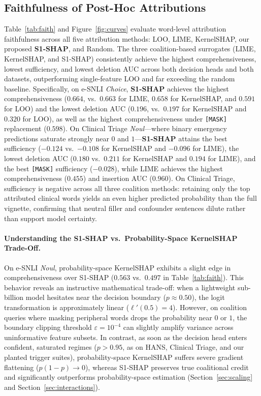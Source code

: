 \documentclass[10pt]{article}
\begin{document}
\subsection{Faithfulness of Post-Hoc Attributions}
Table~\ref{tab:faith} and Figure~\ref{fig:curves} evaluate word-level attribution faithfulness across all five attribution methods: LOO, LIME, KernelSHAP, our proposed \textbf{S1-SHAP}, and Random.
The three coalition-based surrogates (LIME, KernelSHAP, and S1-SHAP) consistently achieve the highest comprehensiveness, lowest sufficiency, and lowest deletion AUC across both decision heads and both datasets, outperforming single-feature LOO and far exceeding the random baseline.
Specifically, on e-SNLI \emph{Choice}, \textbf{S1-SHAP} achieves the highest comprehensiveness ($0.664$, vs.\ $0.663$ for LIME, $0.658$ for KernelSHAP, and $0.591$ for LOO) and the lowest deletion AUC ($0.196$, vs.\ $0.197$ for KernelSHAP and $0.320$ for LOO), as well as the highest comprehensiveness under \texttt{[MASK]} replacement ($0.598$).
On Clinical Triage \emph{Noul}---where binary emergency predictions saturate strongly near $0$ and $1$---\textbf{S1-SHAP} attains the best sufficiency ($-0.124$ vs.\ $-0.108$ for KernelSHAP and $-0.096$ for LIME), the lowest deletion AUC ($0.180$ vs.\ $0.211$ for KernelSHAP and $0.194$ for LIME), and the best \texttt{[MASK]} sufficiency ($-0.028$), while LIME achieves the highest comprehensiveness ($0.455$) and insertion AUC ($0.960$).
On Clinical Triage, sufficiency is negative across all three coalition methods: retaining only the top attributed clinical words yields an even higher predicted probability than the full vignette, confirming that neutral filler and confounder sentences dilute rather than support model certainty.

\paragraph{Understanding the S1-SHAP vs.\ Probability-Space KernelSHAP Trade-Off.}
On e-SNLI \emph{Noul}, probability-space KernelSHAP exhibits a slight edge in comprehensiveness over S1-SHAP ($0.563$ vs.\ $0.497$ in Table~\ref{tab:faith}).
This behavior reveals an instructive mathematical trade-off: when a lightweight sub-billion model hesitates near the decision boundary ($p \approx 0.50$), the logit transformation is approximately linear ($\ell'(0.5) = 4$).
However, on coalition queries where masking peripheral words drops the probability near $0$ or $1$, the boundary clipping threshold $\varepsilon = 10^{-4}$ can slightly amplify variance across uninformative feature subsets.
In contrast, as soon as the decision head enters confident, saturated regimes ($p > 0.95$, as on HANS, Clinical Triage, and our planted trigger suites), probability-space KernelSHAP suffers severe gradient flattening ($p(1-p) \to 0$), whereas S1-SHAP preserves true coalitional credit and significantly outperforms probability-space estimation (Section~\ref{sec:scaling} and Section~\ref{sec:interactions}).
\end{document}

